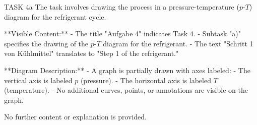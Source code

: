 TASK 4a  
The task involves drawing the process in a pressure-temperature (\(p\)-\(T\)) diagram for the refrigerant cycle.  

**Visible Content:**  
- The title "Aufgabe 4" indicates Task 4.  
- Subtask "a)" specifies the drawing of the \(p\)-\(T\) diagram for the refrigerant.  
- The text "Schritt 1 von Kühlmittel" translates to "Step 1 of the refrigerant."  

**Diagram Description:**  
- A graph is partially drawn with axes labeled:  
  - The vertical axis is labeled \(p\) (pressure).  
  - The horizontal axis is labeled \(T\) (temperature).  
- No additional curves, points, or annotations are visible on the graph.  

No further content or explanation is provided.